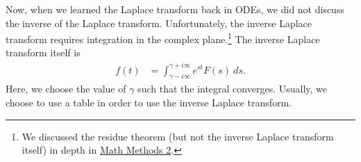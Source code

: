 \documentclass[10pt]{mypackage}
\begin{document}
Now, when we learned the Laplace transform back in ODEs, we did not discuss the inverse of the Laplace transform. Unfortunately, the inverse Laplace transform requires integration in the complex plane.\footnote{We discussed the residue theorem (but not the inverse Laplace transform itself) in depth in \href{https://ai.avinash-iyer.com/Classes_and_Homework/College/Y4/Y4S2,\%20Math\%20Methods\%20II/math_methods_2_notes.pdf}{Math Methods 2}.} The inverse Laplace transform itself is
\begin{align*}
  f(t) &= \int_{\gamma - i\infty}^{\gamma + i\infty} e^{st}F(s)\:ds.
\end{align*}
Here, we choose the value of $\gamma$ such that the integral converges. Usually, we choose to use a table in order to use the inverse Laplace transform.\newline
\end{document}
